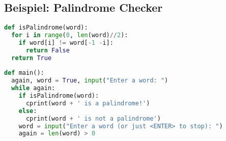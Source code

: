 \subsection{Beispiel: Palindrome Checker}
\begin{lstlisting}[language=Python]
def isPalindrome(word):
  for i in range(0, len(word)//2):
    if word[i] != word[-1 -i]:
      return False
  return True
    
def main():
  again, word = True, input("Enter a word: ")
  while again:
    if isPalindrome(word):
      cprint(word + ' is a palindrome!')
    else:
      cprint(word + ' is not a palindrome')
    word = input("Enter a word (or just <ENTER> to stop): ")
    again = len(word) > 0
\end{lstlisting}\vspace{-6px}
